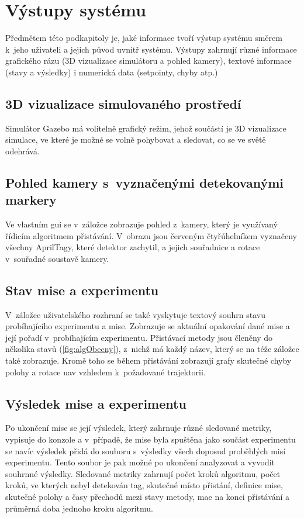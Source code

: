   \section{Výstupy systému} \label{sec:outputs}
  Předmětem této podkapitoly je, jaké informace tvoří výstup systému směrem k~jeho uživateli a jejich původ uvnitř systému. Výstupy zahrnují různé informace grafického rázu (3D vizualizace simulátoru a pohled kamery), textové informace (stavy a výsledky) i numerická data (setpointy, chyby atp.)
    \subsection{3D vizualizace simulovaného prostředí}
      Simulátor Gazebo má volitelně grafický režim, jehož součástí je 3D vizualizace simulace, ve které je možné se volně pohybovat a sledovat, co se ve světě odehrává.
    \subsection{Pohled kamery s~vyznačenými detekovanými markery}
      Ve vlastním \acrshort{gui} se v~záložce  zobrazuje pohled z~kamery, který je využívaný řídicím algoritmem přistávání. V~obrazu jsou červeným čtyřúhelníkem vyznačeny všechny AprilTagy, které detektor zachytil, a jejich souřadnice a rotace v~souřadné soustavě kamery.
    \subsection{Stav mise a experimentu}
      V~záložce  uživatelského rozhraní se také vyskytuje textový souhrn stavu probíhajícího experimentu a mise. Zobrazuje se aktuální opakování dané mise a její pořadí v~probíhajícím experimentu. Přistávací metody jsou členěny do několika stavů (\cref{fig:algObecny}), z~nichž má každý název, který se na téže záložce také zobrazuje. Kromě toho se během přistávání zobrazují grafy skutečné chyby polohy a rotace \acrshort{uav} vzhledem k~požadované trajektorii.
    \subsection{Výsledek mise a experimentu}
      Po ukončení mise se její výsledek, který zahrnuje různé sledované metriky,
      vypisuje do konzole a v~případě, že mise byla spuštěna jako součást experimentu se navíc výsledek přidá do souboru s~výsledky všech doposud proběhlých misí experimentu. Tento soubor je pak možné po ukončení analyzovat a vyvodit souhrnné výsledky. Sledované metriky zahrnují počet kroků algoritmu, počet kroků, ve kterých nebyl detekován tag, skutečné místo přistání, definice mise, skutečné polohy a časy přechodů mezi stavy metody, \acrshort{mae} na konci přistávání a průměrná doba jednoho kroku algoritmu.
